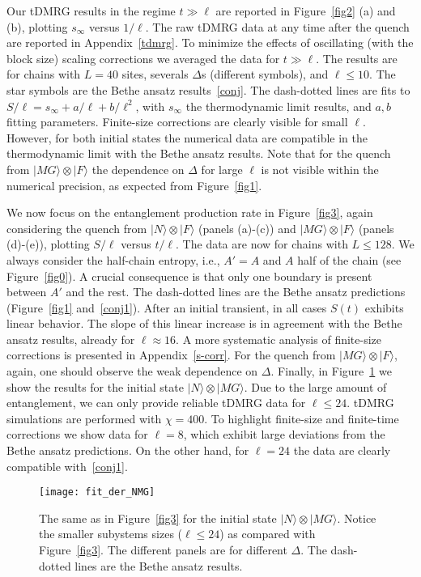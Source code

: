 \documentclass[twocolumn,superscriptaddress,prb,10pt]{revtex4-1}
\begin{document}
Our tDMRG results in the regime $t\gg\ell$ are reported in Figure~\ref{fig2} (a) and (b), plotting $s_\infty$ versus 
$1/\ell$. The raw tDMRG data at any time after the quench are reported in Appendix~\ref{tdmrg}. To minimize 
the effects of oscillating (with the block size) scaling corrections we averaged the data 
for $t\gg\ell$. The results are for chains with 
$L=40$ sites, severals $\Delta$s (different symbols), and $\ell\le 10$. The star symbols 
are the Bethe ansatz results~\eqref{conj}. The dash-dotted lines are fits 
to $S/\ell=s_\infty+a/\ell+b/\ell^2$, with $s_\infty$ the thermodynamic limit results, 
and $a,b$ fitting parameters. Finite-size corrections are clearly visible 
for small $\ell$. However, for both initial states the numerical data are compatible in 
the thermodynamic limit with the Bethe ansatz results. Note that for the quench from 
$|MG\rangle\otimes|F\rangle$ the dependence on $\Delta$ for large $\ell$ is not visible within 
the numerical precision, as expected from Figure~\ref{fig1}. 

We now focus on the entanglement production rate in Figure~\ref{fig3}, again considering the 
quench from $|N\rangle\otimes|F\rangle$ (panels (a)-(c)) and $|MG\rangle\otimes|F\rangle$ (panels (d)-(e)), 
plotting $S/\ell$ versus $t/\ell$. The 
data are now for chains with $L\le 128$. We always consider the half-chain entropy, i.e., $A'=A$ 
and $A$ half of the chain (see Figure~\ref{fig0}). A crucial 
consequence is that only one boundary is present between $A'$ and the rest. The dash-dotted lines are 
the Bethe ansatz predictions (Figure~\ref{fig1} and~\eqref{conj1}). After an initial transient, 
in all cases $S(t)$ exhibits linear behavior. The slope of this linear increase is in agreement 
with the Bethe ansatz results, already for $\ell\approx 16$. A more systematic analysis of 
finite-size corrections is presented in Appendix~\ref{s-corr}. For the quench from $|MG\rangle\otimes|F\rangle$, 
again, one should observe the weak dependence on $\Delta$. Finally, in Figure~\ref{fig4} we 
show the results for the initial state $|N\rangle\otimes|MG\rangle$. Due to the large 
amount of entanglement, we can only provide reliable tDMRG data for $\ell\le 24$. tDMRG simulations 
are performed with $\chi=400$. To highlight finite-size 
and finite-time corrections we show data for $\ell=8$, which exhibit large deviations from 
the Bethe ansatz predictions. On the other hand, for $\ell=24$ the data are clearly  
compatible with~\eqref{conj1}. 

\begin{figure}[t]
\texttt{[image: fit\_der\_NMG]}
\caption{ The same as in Figure~\ref{fig3} for the initial state 
 $|N\rangle\otimes|MG\rangle$. Notice the smaller subystems 
 sizes ($\ell\le 24$) as compared with Figure~\ref{fig3}. The 
 different panels are for different $\Delta$. The dash-dotted lines 
 are the Bethe ansatz results. 
}
\label{fig4}
\end{figure}
\end{document}
